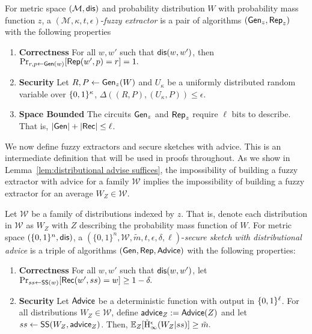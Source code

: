 \begin{definition}
For metric space $(\mathcal{M}, \mathsf{dis})$ and probability distribution $W$ with probability mass function $z$, a $(\mathcal{M}, \kappa, t, \epsilon)$-\emph{fuzzy extractor} is a pair of algorithms $({\mathsf{Gen}}_z, {\mathsf{Rep}}_z)$ with the following properties 
\begin{enumerate} 
\itemsep0em
\item \textbf{Correctness} For all $w, w'$ such that $\mathsf{dis}(w, w')$, then 
$\Pr_{r, p \leftarrow {\ensuremath{\mathsf{Gen}}}(w)}[{\mathsf{Rep}}(w', p) = r]=1.$ 
\item \textbf{Security} Let $R, P \leftarrow {\ensuremath{\mathsf{Gen}}}_z(W)$ and $U_\kappa$ be a uniformly distributed random variable over $\{0, 1\}^\kappa$, $\Delta((R, P), (U_\kappa, P))\le \epsilon.$
\item  \textbf{Space Bounded} The circuits ${\mathsf{Gen}}_z$ and ${\mathsf{Rep}}_z$ require $\ell$ bits to describe.  That is, $|{\mathsf{Gen}}| +|{\mathsf{Rec}}|\le \ell$.
\end{enumerate}
\label{def:fe}
\end{definition}

\noindent
We now define fuzzy extractors and secure sketches with advice.  This is an intermediate definition that will be used in proofs throughout.  As we show in Lemma~\ref{lem:distributional advise suffices}, the impossibility of building a fuzzy extractor with advice for a family $\mathcal{W}$ implies the impossibility of building a fuzzy extractor for an average $W_Z\in\mathcal{W}$.

\begin{definition}
\label{def:ss distributional}
Let $\mathcal{W}$ be a family of distributions indexed by $z$.  That is, denote each distribution in $\mathcal{W}$ as $W_Z$ with $Z$ describing the probability mass function of $W$.  
For metric space $(\{0,1\}^n, \mathsf{dis})$, a $(\{0,1\}^n, \mathcal{W}, \tilde{m}, t, \epsilon, \delta, \ell)$-\emph{secure sketch with distributional advice} is a triple of algorithms $({\mathsf{Gen}}, {\mathsf{Rep}}, {\mathsf{Advice}})$ with the following properties:
\begin{enumerate} 
\itemsep0em
\item \textbf{Correctness} For all $w, w'$ such that $\mathsf{dis}(w, w')$, let $\Pr_{ss \leftarrow {\ensuremath{\mathsf{SS}}}(w)}[{\mathsf{Rec}}(w', ss) = w]\ge 1-\delta.$
\item \textbf{Security} Let ${\mathsf{Advice}}$ be a deterministic function with output in $\{0, 1\}^\ell$.  For all distributions $W_Z \in \mathcal{W}$, define ${\mathsf{advice}}_Z:= {\mathsf{Advice}}(Z)$ and let $ss \leftarrow {\ensuremath{\mathsf{SS}}}(W_Z, {\mathsf{advice}}_Z)$. Then,
$
\operatorname*{\mathbb{E}}_{Z} [\tilde{\mathrm{H}}_\infty^\epsilon(W_Z| ss)] \ge \tilde{m}.
$
\end{enumerate}
\end{definition}


